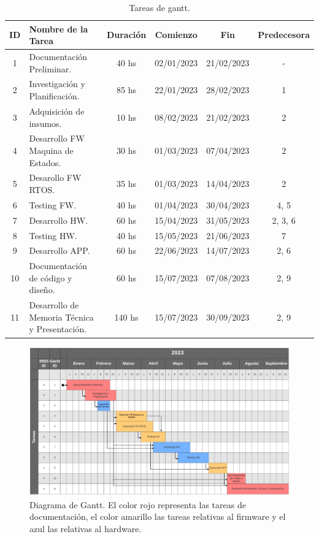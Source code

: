 \documentclass[
11pt, %
]{charter}
\begin{document}
\begin{table}[htpb]
\centering
\begin{tabularx}{\linewidth}{@{}|c|X|c|c|c|c|@{}}
\hline
\rowcolor[HTML]{C0C0C0} 
ID & Nombre de la Tarea & Duración & Comienzo & Fin & Predecesora \\ \hline
1&Documentación Preliminar.&40 hs&02/01/2023&21/02/2023&-\\ \hline
2&Investigación y Planificación.&85 hs&22/01/2023&28/02/2023&1\\ \hline
3&Adquisición de insumos.&10 hs&08/02/2023&21/02/2023&2\\ \hline
4&Desarrollo FW Maquina de Estados.&30 hs&01/03/2023&07/04/2023&2\\ \hline
5&Desarollo FW RTOS.&35 hs&01/03/2023&14/04/2023&2\\ \hline
6&Testing FW.&40 hs&01/04/2023&30/04/2023&4, 5\\ \hline
7&Desarrollo HW.&60 hs&15/04/2023&31/05/2023&2, 3, 6\\ \hline
8&Testing HW.&40 hs&15/05/2023&21/06/2023&7\\ \hline
9&Desarrollo APP.&60 hs&22/06/2023&14/07/2023&2, 6\\ \hline
10&Documentación de código y diseño.&60 hs&15/07/2023&07/08/2023&2, 9\\ \hline
11&Desarrollo de Memoria Técnica y Presentación.&140 hs&15/07/2023&30/09/2023&2, 9\\ \hline
\end{tabularx}%
\caption{Tareas de gantt.}
\label{tab:tabGantt}
\end{table}

\begin{landscape}
\begin{figure}[htpb]
\centering 
\includegraphics[height=.85\textheight]{./Figuras/diagGantt.png}
\caption{Diagrama de Gantt. El color rojo representa las tareas de documentación, el color amarillo las tareas relativas al firmware y el azul las relativas al hardware.}
\label{fig:diagGantt}
\end{figure}

\end{landscape}
\end{document}
